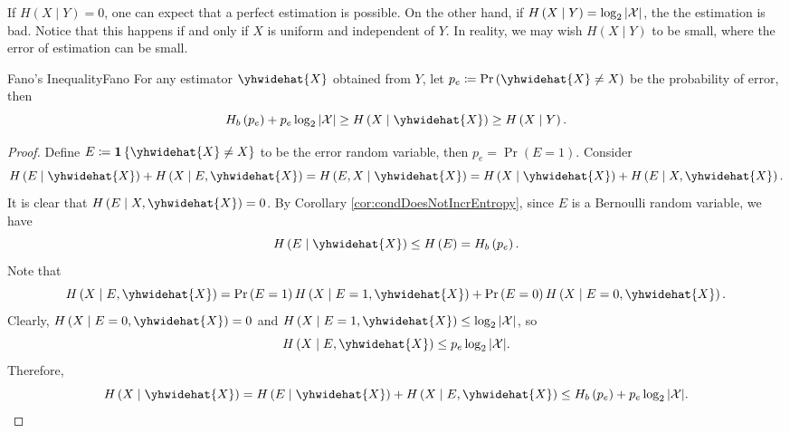 \documentclass[math]{amznotes}
\theoremstyle{remark}
\begin{document}
If $H\left(X \mid Y\right) = 0$, one can expect that a perfect estimation is possible. On the other hand, if $H\left(X \mid Y\right) = \log_2{\left\lvert {\mathcal{X}} \right\rvert}$, the the estimation is bad. Notice that this happens if and only if $X$ is uniform and independent of $Y$. In reality, we may wish $H\left(X \mid Y\right)$ to be small, where the error of estimation can be small.
\begin{thmbox}{Fano's Inequality}{Fano}
    For any estimator $\yhwidehat{X}$ obtained from $Y$, let $p_e \coloneqq \Pr\left(\yhwidehat{X} \neq X\right)$ be the probability of error, then 
    \begin{equation*}
        H_b\left(p_e\right) + p_e\log_2\abs{\mathcal{X}} \geq H\left(X \mid \yhwidehat{X}\right) \geq H\left(X \mid Y\right).
    \end{equation*}
    \tcblower
    \begin{proof}
        Define $E \coloneqq \mathbf{1}\left\{\yhwidehat{X} \neq X\right\}$ to be the error random variable, then $p_e = \Pr\left(E = 1\right)$. Consider 
        \begin{equation*}
            H\left(E \mid \yhwidehat{X}\right) + H\left(X \mid E, \yhwidehat{X}\right) = H\left(E, X \mid \yhwidehat{X}\right) = H\left(X \mid \yhwidehat{X}\right) + H\left(E \mid X, \yhwidehat{X}\right).
        \end{equation*}
        It is clear that $H\left(E \mid X, \yhwidehat{X}\right) = 0$. By Corollary \ref{cor:condDoesNotIncrEntropy}, since $E$ is a Bernoulli random variable, we have 
        \begin{equation*}
            H\left(E \mid \yhwidehat{X}\right) \leq H\left(E\right) = H_b\left(p_e\right).
        \end{equation*}
        Note that 
        \begin{equation*}
            H\left(X \mid E, \yhwidehat{X}\right) = \Pr\left(E = 1\right)H\left(X \mid E = 1, \yhwidehat{X}\right) + \Pr\left(E = 0\right)H\left(X \mid E = 0, \yhwidehat{X}\right).
        \end{equation*}
        Clearly, $H\left(X \mid E = 0, \yhwidehat{X}\right) = 0$ and $H\left(X \mid E = 1, \yhwidehat{X}\right) \leq \log_2\abs{\mathcal{X}}$, so 
        \begin{equation*}
            H\left(X \mid E, \yhwidehat{X}\right) \leq p_e\log_2\abs{\mathcal{X}}.
        \end{equation*}
        Therefore, 
        \begin{equation*}
            H\left(X \mid \yhwidehat{X}\right) = H\left(E \mid \yhwidehat{X}\right) + H\left(X \mid E, \yhwidehat{X}\right) \leq H_b\left(p_e\right) + p_e\log_2\abs{\mathcal{X}}.

\end{equation*}
\end{proof}
\end{thmbox}
\end{document}
